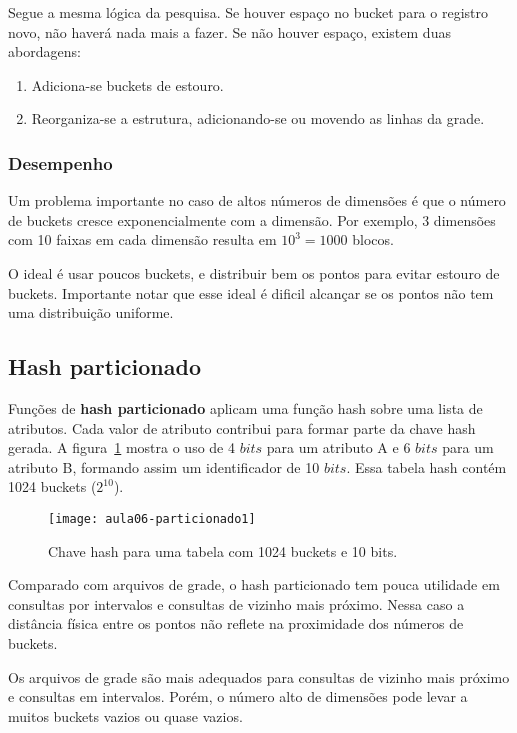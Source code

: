 Segue a mesma lógica da pesquisa. Se houver espaço no bucket para o registro novo,
não haverá nada mais a fazer.
Se não houver espaço, existem duas abordagens:
\begin{enumerate}
\item Adiciona-se buckets de estouro.
\item Reorganiza-se a estrutura, adicionando-se ou movendo as linhas da grade.
\end{enumerate}

\subsubsection{Desempenho}

Um problema importante no caso de altos números de dimensões é que o número de buckets
cresce exponencialmente com a dimensão. Por exemplo, 3 dimensões com 10 faixas em cada dimensão
resulta em $10^3 = 1000$ blocos.

O ideal é usar poucos buckets, e distribuir bem os pontos para evitar estouro
de buckets.  Importante notar que esse ideal é dificil alcançar se os pontos
não tem uma distribuição uniforme.

\subsection{Hash particionado}

Funções de \textbf{hash particionado} aplicam uma função hash sobre uma lista
de atributos.
Cada valor de atributo contribui para formar parte da chave hash gerada.
A figura~\ref{aula06:fig:particionado1} mostra o uso de 4 $bits$ para um atributo A
e  6 $bits$ para um atributo B, formando assim um identificador de 10 $bits$.
Essa tabela hash contém 1024 buckets ($2^{10}$).
%
\begin{figure}[!htb]
\centering
\texttt{[image: aula06-particionado1]}
\caption{Chave hash para uma tabela com 1024 buckets e 10 bits.}
\label{aula06:fig:particionado1}
\end{figure}

Comparado com arquivos de grade, o hash particionado tem pouca utilidade em
consultas por intervalos e consultas de vizinho mais próximo.
Nessa caso a distância física entre os pontos não reflete na proximidade dos números
de buckets.

Os arquivos de grade são mais adequados para consultas de vizinho mais próximo e consultas
em intervalos. Porém, o número alto de dimensões pode levar a muitos buckets vazios ou
quase vazios.

